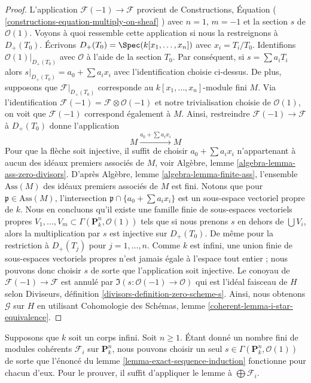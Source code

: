 \begin{proof}
L'application $\mathcal{F}(-1) \to \mathcal{F}$ provient
de Constructions, Équation (
\ref{constructions-equation-multiply-on-sheaf} ) avec $n =
1$, $m = -1$ et la section $s$ de $\mathcal{O}(1)$. Voyons à
quoi ressemble cette application si nous la restreignons à
$D_{+}(T_0)$. Écrivons $D_{+}(T_0) = \Spec(k[x_1, \ldots,
x_n])$ avec $x_i = T_i/T_0$. Identifions
$\mathcal{O}(1)|_{D_{+}(T_0)}$ avec $\mathcal{O}$ à l'aide de la
section $T_0$. Par conséquent, si $s = \sum a_iT_i$ alors
$s|_{D_{+}(T_0)} = a_0 + \sum a_ix_i$ avec l'identification
choisie ci-dessus. De plus, supposons que
$\mathcal{F}|_{D_{+}(T_0)}$ corresponde au $k[x_1, \ldots, x_n]$-module
fini $M$. Via l'identification $\mathcal{F}(-1) = \mathcal{F} \otimes
\mathcal{O}(-1)$ et notre trivialisation choisie de $\mathcal{O}(1)$,
on voit que $\mathcal{F}(-1)$ correspond également à $M$. Ainsi,
restreindre $\mathcal{F}(-1) \to \mathcal{F}$ à $D_{+}(T_0)$ donne l'application
$$
M \xrightarrow{a_0 + \sum a_ix_i} M
$$
Pour que la flèche soit injective, il suffit de choisir $a_0
+ \sum a_ix_i$ n'appartenant à aucun des idéaux premiers
associés de $M$, voir Algèbre, lemme
\ref{algebra-lemma-ass-zero-divisors}. D'après Algèbre, lemme
\ref{algebra-lemma-finite-ass}, l'ensemble $\text{Ass}(M)$ des
idéaux premiers associés de $M$ est fini. Notons que pour
$\mathfrak p \in \text{Ass}(M)$, l'intersection $\mathfrak p \cap
\{a_0 + \sum a_i x_i\}$ est un sous-espace vectoriel propre de $k$.
Nous en concluons qu'il existe une famille finie de sous-espaces
vectoriels propres $V_1, \ldots, V_m \subset \Gamma(\mathbf{P}^n_k,
\mathcal{O}(1))$ tels que si nous prenons $s$ en dehors de $\bigcup
V_i$, alors la multiplication par $s$ est injective sur
$D_{+}(T_0)$. De même pour la restriction à $D_{+}(T_j)$ pour $j =
1, \ldots, n$. Comme $k$ est infini, une union finie de sous-espaces
vectoriels propres n'est jamais égale à l'espace tout entier ; nous
pouvons donc choisir $s$ de sorte que l'application soit
injective. Le conoyau de $\mathcal{F}(-1) \to \mathcal{F}$ est annulé
par $\Im(s : \mathcal{O}(-1) \to \mathcal{O})$ qui est l'idéal
faisceau de $H$ selon Diviseurs, définition
\ref{divisors-definition-zero-scheme-s}. Ainsi, nous obtenons $\mathcal{G}$ sur $H$ en
utilisant Cohomologie des Schémas, lemme \ref{coherent-lemma-i-star-equivalence}.
\end{proof}

\begin{remark}
\label{remark-exact-sequence-induction}
Supposons que $k$ soit un corps infini. Soit $n \geq 1$. Étant
donné un nombre fini de modules cohérents $\mathcal{F}_i$ sur
$\mathbf{P}^n_k$, nous pouvons choisir un seul $s \in
\Gamma(\mathbf{P}^n_k, \mathcal{O}(1))$ de sorte que l'énoncé du lemme
\ref{lemma-exact-sequence-induction} fonctionne pour chacun d'eux. Pour
le prouver, il suffit d'appliquer le lemme à $\bigoplus \mathcal{F}_i$.
\end{remark}

